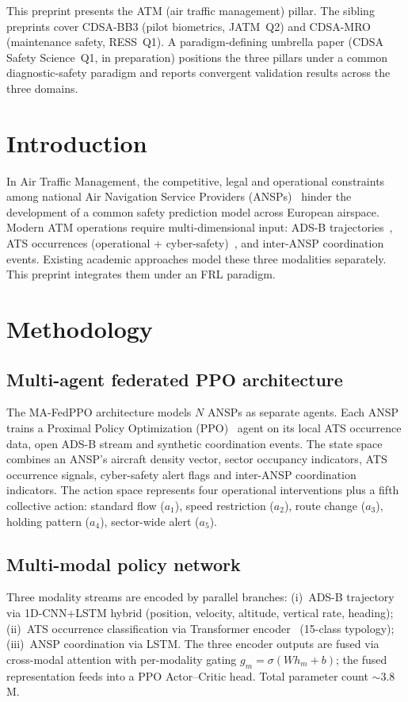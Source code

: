 \documentclass[11pt]{article}
\begin{document}
This preprint presents the ATM (air traffic management) pillar. The sibling preprints cover CDSA-BB3 (pilot biometrics, JATM~Q2) and CDSA-MRO (maintenance safety, RESS~Q1). A paradigm-defining umbrella paper (CDSA Safety Science~Q1, in preparation) positions the three pillars under a common diagnostic-safety paradigm and reports convergent validation results across the three domains.

\section{Introduction}
In Air Traffic Management, the competitive, legal and operational constraints among national Air Navigation Service Providers (ANSPs)~\cite{eu2017373} hinder the development of a common safety prediction model across European airspace. Modern ATM operations require multi-dimensional input: ADS-B trajectories~\cite{opensky}, ATS occurrences (operational + cyber-safety)~\cite{esarr2, annex11, doc4444}, and inter-ANSP coordination events. Existing academic approaches model these three modalities separately. This preprint integrates them under an FRL paradigm.

\section{Methodology}
\subsection{Multi-agent federated PPO architecture}
The MA-FedPPO architecture models $N$ ANSPs as separate agents. Each ANSP trains a Proximal Policy Optimization (PPO)~\cite{schulman2017, sutton2018} agent on its local ATS occurrence data, open ADS-B stream and synthetic coordination events. The state space combines an ANSP's aircraft density vector, sector occupancy indicators, ATS occurrence signals, cyber-safety alert flags and inter-ANSP coordination indicators. The action space represents four operational interventions plus a fifth collective action: standard flow ($a_1$), speed restriction ($a_2$), route change ($a_3$), holding pattern ($a_4$), sector-wide alert ($a_5$).

\subsection{Multi-modal policy network}
Three modality streams are encoded by parallel branches: (i)~ADS-B trajectory via 1D-CNN+LSTM hybrid (position, velocity, altitude, vertical rate, heading); (ii)~ATS occurrence classification via Transformer encoder~\cite{vaswani2017} (15-class typology); (iii)~ANSP coordination via LSTM. The three encoder outputs are fused via cross-modal attention with per-modality gating $g_m = \sigma(W h_m + b)$; the fused representation feeds into a PPO Actor--Critic head. Total parameter count ${\sim}3.8$M.
\end{document}
